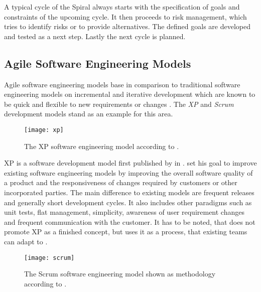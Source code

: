 A typical cycle of the Spiral always starts with the specification of goals and
constraints of the upcoming cycle. It then proceeds to risk management, which
tries to identify risks or to provide alternatives. The defined goals are
developed and tested as a next step. Lastly the next cycle is planned.


\subsection{Agile Software Engineering Models} %

Agile software engineering models base in comparison to traditional software
engineering models on incremental and iterative development which are known to
be quick and flexible to new requirements or changes \cite{Beck1999}. The
\emph{\acl{XP}} and \emph{Scrum} development models stand as an example for
this area.

\begin{figure}[htbp]
  \centering
  \texttt{[image: xp]}
  \caption[\acl{XP} Model]
  {The \acl{XP} software engineering model according to \textcite{Beck1999a}.}
\end{figure}

\ac{XP} is a software development model first published by
\citeauthor{Beck1999} \cite{Beck1999a} in \citeyear{Beck1999}.
\citeauthor{Beck1999} set his goal to improve existing software engineering
models by improving the overall software quality of a product and the
responsiveness of changes required by customers or other incorporated parties.
The main difference to existing models are frequent releases and generally
short development cycles. It also includes other paradigms such as unit tests,
flat management, simplicity, awareness of user requirement changes and frequent
communication with the customer. It has to be noted, that \citeauthor{Beck1999}
does not promote \acl{XP} as a finished concept, but uses it as a process, that
existing teams can adapt to \cite{Beck1999}.

\begin{figure}[htbp]
  \centering
  \texttt{[image: scrum]}
  \caption[Scrum Model]
  {The Scrum software engineering model shown as methodology according to
    \textcite{Schwaber1995}.}
\end{figure}


